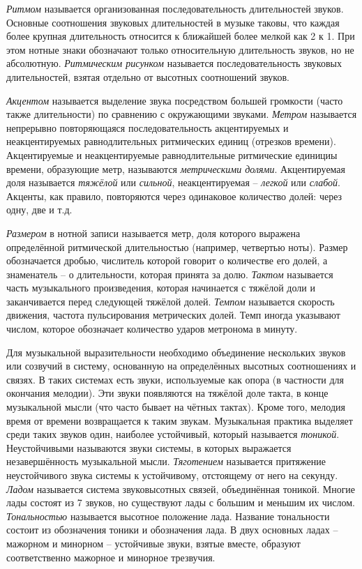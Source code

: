 \emph{Ритмом} называется организованная последовательность длительностей звуков.
Основные соотношения звуковых длительностей в музыке таковы, что каждая более
крупная длительность относится к ближайшей более мелкой как 2 к 1. При этом
нотные знаки обозначают только относительную длительность звуков, но не
абсолютную. \emph{Ритмическим рисунком} называется последовательность звуковых
длительностей, взятая отдельно от высотных соотношений звуков.

\emph{Акцентом} называется выделение звука посредством большей громкости (часто
также длительности) по сравнению с окружающими звуками. \emph{Метром} называется
непрерывно повторяющаяся последовательность акцентируемых и неакцентируемых
равнодлительных ритмических единиц (отрезков времени). Акцентируемые и
неакцентируемые равнодлительные ритмические единициы времени, образующие метр,
называются \emph{метрическими долями}. Акцентируемая доля называется
\emph{тяжёлой} или \emph{сильной}, неакцентируемая -- \emph{легкой} или
\emph{слабой}. Акценты, как правило, повторяются через одинаковое количество
долей: через одну, две и т.д.

\emph{Размером} в нотной записи называется метр, доля которого выражена
определённой ритмической длительностью (например, четвертью ноты). Размер
обозначается дробью, числитель которой говорит о количестве его долей, а
знаменатель -- о длительности, которая принята за долю. \emph{Тактом} называется
часть музыкального произведения, которая начинается с тяжёлой доли и
заканчивается перед следующей тяжёлой долей. \emph{Темпом} называется скорость
движения, частота пульсирования метрических долей. Темп иногда указывают числом,
которое обозначает количество ударов метронома в минуту.

Для музыкальной выразительности необходимо объединение нескольких звуков или
созвучий в систему, основанную на определённых высотных соотношениях и связях. В
таких системах есть звуки, используемые как опора (в частности для окончания
мелодии). Эти звуки появляются на тяжёлой доле такта, в конце музыкальной мысли
(что часто бывает на чётных тактах). Кроме того, мелодия время от времени
возвращается к таким звукам. Музыкальная практика выделяет среди таких звуков
один, наиболее устойчивый, который называется \emph{тоникой}. Неустойчивыми
называются звуки системы, в которых выражается незавершённость музыкальной
мысли. \emph{Тяготением} называется притяжение неустойчивого звука системы к
устойчивому, отстоящему от него на секунду. \emph{Ладом} называется система
звуковысотных связей, объединённая тоникой. Многие лады состоят из 7 звуков, но
существуют лады с большим и меньшим их числом. \emph{Тональностью} называется
высотное положение лада. Название тональности состоит из обозначения тоники и
обозначения лада. В двух основных ладах -- мажорном и минорном -- устойчивые
звуки, взятые вместе, образуют соответственно мажорное и минорное трезвучия.

